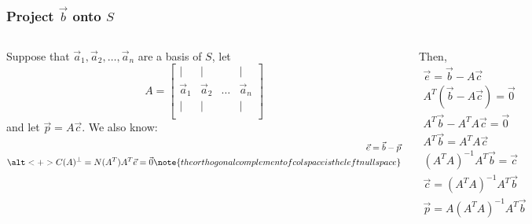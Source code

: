 \documentclass[12pt]{beamer}
\begin{document}
\begin{frame}
    \frametitle{Project $\vec{b}$ onto $S$}

    \begin{columns}
        \pause

        Suppose that $\vec{a}_1, \vec{a}_2, \dots, \vec{a}_n$ are a basis of $S$, let
        $$
            A =
            \begin{bmatrix}
                \vert     & \vert     &        & \vert     \\
                \vec{a}_1 & \vec{a}_2 & \hdots & \vec{a}_n \\
                \vert     & \vert     &        & \vert     \\
            \end{bmatrix}
        $$
        and let $\vec{p} = A\vec{c}$.
        We also know:
        \begin{align*}
            \vec{e} = \vec{b} - \vec{p} \\
            \alt<+>{C(A)^\perp = N(A^T)}{A^T \vec{e} = \vec{0}} \note{the orthogonal complement of col space is the left null space}
        \end{align*}

        \pause
        Then,
        \begin{align*}
            \vec{e} = \vec{b} - A\vec{c}               \\
            A^T (\vec{b} - A\vec{c}) = \vec{0}         \\
            A^T \vec{b} - A^T A \vec{c} = \vec{0}      \\
            A^T \vec{b} = A^T A \vec{c}                \\
            (A^T A)^{-1} A^T \vec{b} = \vec{c}         \\
            \boxed{\vec{c} = (A^T A)^{-1} A^T \vec{b}} \\
            \boxed{\vec{p} = A(A^T A)^{-1} A^T \vec{b}}
        \end{align*}

    \end{columns}
\end{frame}
\end{document}
